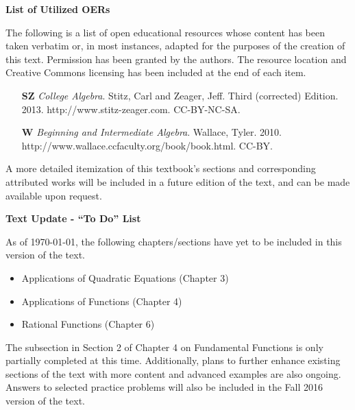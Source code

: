 \begin{center}\textbf{List of Utilized OERs} \end{center}\par The following is a list of open educational resources whose content has been taken verbatim or, in most instances, adapted for the purposes of the creation of this text.  Permission has been granted by the authors.  The resource location and Creative Commons licensing has been included at the end of each item.  %
\begin{itemize}
	\item[{\bf SZ}] \textit{College Algebra}.  Stitz, Carl and Zeager, Jeff.  Third (corrected) Edition.  2013. http://www.stitz-zeager.com.  CC-BY-NC-SA.
	\item[{\bf W}] \textit{Beginning and Intermediate Algebra}.  Wallace, Tyler.  2010.\\
	http://www.wallace.ccfaculty.org/book/book.html. CC-BY.
\end{itemize}
A more detailed itemization of this textbook's sections and corresponding attributed works will be included in a future edition of the text, and can be made available upon request.%

\newpage

\begin{center}\textbf{Text Update - ``To Do'' List} \end{center}\par
As of \today, the following chapters/sections have yet to be included in this version of the text.
\begin{itemize}
		\item Applications of Quadratic Equations (Chapter 3)
		\item Applications of Functions (Chapter 4)
		\item Rational Functions (Chapter 6)
\end{itemize}
The subsection in Section 2 of Chapter 4 on Fundamental Functions is only partially completed at this time.  Additionally, plans to further enhance existing sections of the text with more content and advanced examples are also ongoing.  Answers to selected practice problems will also be included in the Fall 2016 version of the text.